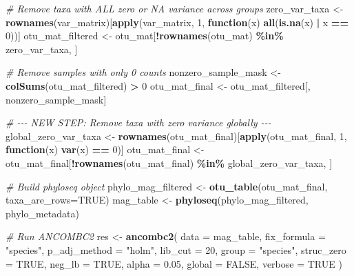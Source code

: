 \documentclass[
]{book}
\newenvironment{Shaded}{\begin{snugshade}}{\end{snugshade}}
\newcommand{\AttributeTok}[1]{\textcolor[rgb]{0.13,0.29,0.53}{#1}}
\newcommand{\CommentTok}[1]{\textcolor[rgb]{0.56,0.35,0.01}{\textit{#1}}}
\newcommand{\ConstantTok}[1]{\textcolor[rgb]{0.56,0.35,0.01}{#1}}
\newcommand{\ControlFlowTok}[1]{\textcolor[rgb]{0.13,0.29,0.53}{\textbf{#1}}}
\newcommand{\DecValTok}[1]{\textcolor[rgb]{0.00,0.00,0.81}{#1}}
\newcommand{\FloatTok}[1]{\textcolor[rgb]{0.00,0.00,0.81}{#1}}
\newcommand{\FunctionTok}[1]{\textcolor[rgb]{0.13,0.29,0.53}{\textbf{#1}}}
\newcommand{\NormalTok}[1]{#1}
\newcommand{\OtherTok}[1]{\textcolor[rgb]{0.56,0.35,0.01}{#1}}
\newcommand{\SpecialCharTok}[1]{\textcolor[rgb]{0.81,0.36,0.00}{\textbf{#1}}}
\newcommand{\StringTok}[1]{\textcolor[rgb]{0.31,0.60,0.02}{#1}}
\begin{document}
\begin{Shaded}
\begin{Highlighting}[]
\CommentTok{\# Remove taxa with ALL zero or NA variance across groups}
\NormalTok{zero\_var\_taxa }\OtherTok{\textless{}{-}} \FunctionTok{rownames}\NormalTok{(var\_matrix)[}\FunctionTok{apply}\NormalTok{(var\_matrix, }\DecValTok{1}\NormalTok{, }\ControlFlowTok{function}\NormalTok{(x) }\FunctionTok{all}\NormalTok{(}\FunctionTok{is.na}\NormalTok{(x) }\SpecialCharTok{|}\NormalTok{ x }\SpecialCharTok{==} \DecValTok{0}\NormalTok{))]}
\NormalTok{otu\_mat\_filtered }\OtherTok{\textless{}{-}}\NormalTok{ otu\_mat[}\SpecialCharTok{!}\FunctionTok{rownames}\NormalTok{(otu\_mat) }\SpecialCharTok{\%in\%}\NormalTok{ zero\_var\_taxa, ]}

\CommentTok{\# Remove samples with only 0 counts}
\NormalTok{nonzero\_sample\_mask }\OtherTok{\textless{}{-}} \FunctionTok{colSums}\NormalTok{(otu\_mat\_filtered) }\SpecialCharTok{\textgreater{}} \DecValTok{0}
\NormalTok{otu\_mat\_final }\OtherTok{\textless{}{-}}\NormalTok{ otu\_mat\_filtered[, nonzero\_sample\_mask]}

\CommentTok{\# {-}{-}{-} NEW STEP: Remove taxa with zero variance globally {-}{-}{-}}
\NormalTok{global\_zero\_var\_taxa }\OtherTok{\textless{}{-}} \FunctionTok{rownames}\NormalTok{(otu\_mat\_final)[}\FunctionTok{apply}\NormalTok{(otu\_mat\_final, }\DecValTok{1}\NormalTok{, }\ControlFlowTok{function}\NormalTok{(x) }\FunctionTok{var}\NormalTok{(x) }\SpecialCharTok{==} \DecValTok{0}\NormalTok{)]}
\NormalTok{otu\_mat\_final }\OtherTok{\textless{}{-}}\NormalTok{ otu\_mat\_final[}\SpecialCharTok{!}\FunctionTok{rownames}\NormalTok{(otu\_mat\_final) }\SpecialCharTok{\%in\%}\NormalTok{ global\_zero\_var\_taxa, ]}

\CommentTok{\# Build phyloseq object}
\NormalTok{phylo\_mag\_filtered }\OtherTok{\textless{}{-}} \FunctionTok{otu\_table}\NormalTok{(otu\_mat\_final, }\AttributeTok{taxa\_are\_rows=}\ConstantTok{TRUE}\NormalTok{)}
\NormalTok{mag\_table }\OtherTok{\textless{}{-}} \FunctionTok{phyloseq}\NormalTok{(phylo\_mag\_filtered, phylo\_metadata)}

\CommentTok{\# Run ANCOMBC2}
\NormalTok{res }\OtherTok{\textless{}{-}} \FunctionTok{ancombc2}\NormalTok{(}
  \AttributeTok{data =}\NormalTok{ mag\_table,}
  \AttributeTok{fix\_formula =} \StringTok{"species"}\NormalTok{,}
  \AttributeTok{p\_adj\_method =} \StringTok{"holm"}\NormalTok{,}
  \AttributeTok{lib\_cut =} \DecValTok{20}\NormalTok{,}
  \AttributeTok{group =} \StringTok{"species"}\NormalTok{,}
  \AttributeTok{struc\_zero =} \ConstantTok{TRUE}\NormalTok{,}
  \AttributeTok{neg\_lb =} \ConstantTok{TRUE}\NormalTok{,}
  \AttributeTok{alpha =} \FloatTok{0.05}\NormalTok{,}
  \AttributeTok{global =} \ConstantTok{FALSE}\NormalTok{,}
  \AttributeTok{verbose =} \ConstantTok{TRUE}
\NormalTok{)}



\end{Highlighting}
\end{Shaded}
\end{document}
